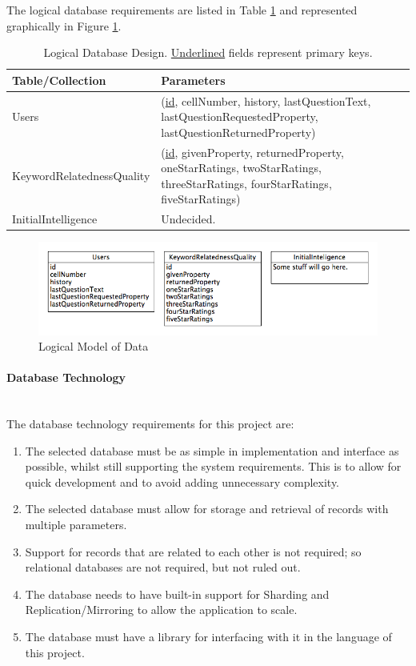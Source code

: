 \documentclass{article}
\newcommand{\myparagraph}[1]{\paragraph{#1}\mbox{}\\}
\begin{document}
The logical database requirements are listed in Table \ref{table:logicalDatabaseDesignListing} and represented graphically in Figure \ref{fig:logicalDatabaseDesignDiagram}.

\begin{table}
\begin{center}
    \begin{tabular}{| l | p{6cm} |}
    \hline
    Table/Collection & Parameters \\ \hline
    Users & (\underline{id}, cellNumber, history, lastQuestionText, lastQuestionRequestedProperty, lastQuestionReturnedProperty) \\ \hline
    KeywordRelatednessQuality & (\underline{id}, givenProperty, returnedProperty, oneStarRatings, twoStarRatings, threeStarRatings, fourStarRatings, fiveStarRatings) \\ \hline
    InitialIntelligence & \color{red} Undecided. \\ \hline
    \end{tabular}
    \caption{Logical Database Design.  \underline{Underlined} fields represent primary keys.}
    \label{table:logicalDatabaseDesignListing}
\end{center}
\end{table}

\begin{figure}[htb] 
\includegraphics[width=\linewidth]{logicalModel}
\caption{Logical Model of Data}
\label{fig:logicalDatabaseDesignDiagram}
\end{figure}

\myparagraph{Database Technology}
The database technology requirements for this project are:

\begin{enumerate}
  \item The selected database must be as simple in implementation and interface as possible, whilst still supporting the system requirements.  This is to allow for quick development and to avoid adding unnecessary complexity.
  \item The selected database must allow for storage and retrieval of records with multiple parameters.
  \item Support for records that are related to each other is not required; so relational databases are not required, but not ruled out.
  \item The database needs to have built-in support for Sharding and Replication/Mirroring to allow the application to scale.
  \item The database must have a library for interfacing with it in the language of this project.
\end{enumerate}
\end{document}
